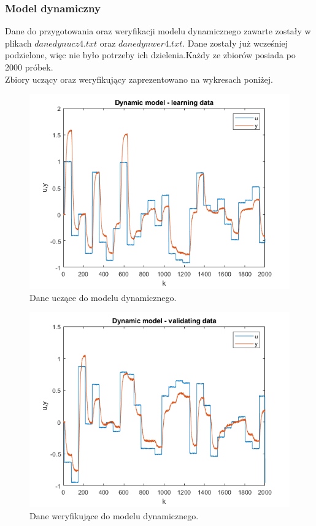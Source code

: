 \subsubsection{Model dynamiczny}
Dane do przygotowania oraz weryfikacji modelu dynamicznego zawarte zostały w plikach $danedynucz4.txt$ oraz $danedynwer4.txt$. Dane zostały już wcześniej podzielone, więc nie było potrzeby ich dzielenia.Każdy ze zbiorów posiada po 2000 próbek.\\
Zbiory uczący oraz weryfikujący zaprezentowano na wykresach poniżej.
\begin{figure}[H]
\centering
\includegraphics[width=15cm]{images/23.png}
\caption{Dane uczące do modelu dynamicznego.}
\label{fig:2}
\end{figure}
\begin{figure}[H]
\centering
\includegraphics[width=15cm]{images/24.png}
\caption{Dane weryfikujące do modelu dynamicznego.}
\label{fig:3}
\end{figure}

